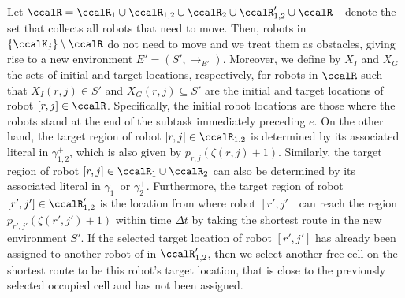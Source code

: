 \documentclass[journal]{IEEEtran}
\renewcommand{\ap}[3]{\mathcal{\pi}_{{#1},{#2}}^{#3}}
\begin{document}
{Let $ \ccalR = \ccalR_1 \cup\ccalR_{1,2} \cup \ccalR_{2} \cup \ccalR'_{1,2} \cup \ccalR^-$ denote the set that collects all robots that need to move.  Then, robots in $\{\ccalK_j\}\setminus\ccalR$ do not need to move and we treat them as obstacles, giving rise to a new environment $E'=(S', \to_{E'})$. %
Moreover, we define by $X_I$ and $X_G$ the sets of initial and target locations, respectively, for robots in $\ccalR$ such that $X_I(r,j) \in S'$ and $X_G(r,j)\subseteq S'$ are the initial  and target locations of robot $[r,j] \in \ccalR$. Specifically, the initial robot locations are those where the robots stand at the end of the subtask immediately preceding $e$. On the other hand, the target region of  robot $[r,j] \in \ccalR_{1,2}$ is determined  by its associated literal in $\gamma_{1,2}^+$, which is also given by  $p_{r,j}(\zeta(r,j)+1)$. Similarly, the target region of robot $[r,j] \in \ccalR_{1} \cup \ccalR_{2}$ can also be determined by its associated literal in $\gamma_1^+$ or $\gamma_2^+$. Furthermore, the target region of robot $[r',j'] \in \ccalR'_{1,2}$ is the  location from where robot $[r',j']$ can reach the region $p_{r',j'}(\zeta(r',j')+1)$ within time $\Delta t$ by taking the shortest route in the new environment $S'$. If the selected target location of robot $[r',j']$ has already been assigned to another robot of in $\ccalR'_{1,2}$, then we select another free cell on the shortest route to be this robot's target location, that is close to the previously selected occupied cell and has not been assigned.

}
\end{document}
